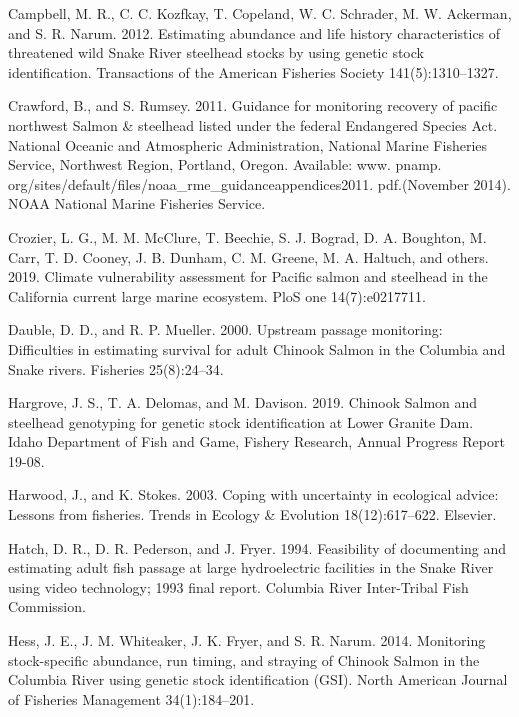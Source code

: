 \documentclass[
  12pt,
]{article}
\begin{document}
\leavevmode\hypertarget{ref-Campbell2012}{}%
Campbell, M. R., C. C. Kozfkay, T. Copeland, W. C. Schrader, M. W. Ackerman, and S. R. Narum. 2012. Estimating abundance and life history characteristics of threatened wild Snake River steelhead stocks by using genetic stock identification. Transactions of the American Fisheries Society 141(5):1310--1327.

\leavevmode\hypertarget{ref-Crawford2011}{}%
Crawford, B., and S. Rumsey. 2011. Guidance for monitoring recovery of pacific northwest Salmon \& steelhead listed under the federal Endangered Species Act. National Oceanic and Atmospheric Administration, National Marine Fisheries Service, Northwest Region, Portland, Oregon. Available: www. pnamp. org/sites/default/files/noaa\_rme\_guidanceappendices2011. pdf.(November 2014). NOAA National Marine Fisheries Service.

\leavevmode\hypertarget{ref-Crozier2019}{}%
Crozier, L. G., M. M. McClure, T. Beechie, S. J. Bograd, D. A. Boughton, M. Carr, T. D. Cooney, J. B. Dunham, C. M. Greene, M. A. Haltuch, and others. 2019. Climate vulnerability assessment for Pacific salmon and steelhead in the California current large marine ecosystem. PloS one 14(7):e0217711.

\leavevmode\hypertarget{ref-Dauble2000}{}%
Dauble, D. D., and R. P. Mueller. 2000. Upstream passage monitoring: Difficulties in estimating survival for adult Chinook Salmon in the Columbia and Snake rivers. Fisheries 25(8):24--34.

\leavevmode\hypertarget{ref-Hargrove2019}{}%
Hargrove, J. S., T. A. Delomas, and M. Davison. 2019. Chinook Salmon and steelhead genotyping for genetic stock identification at Lower Granite Dam. Idaho Department of Fish and Game, Fishery Research, Annual Progress Report 19-08.

\leavevmode\hypertarget{ref-Harwood2003}{}%
Harwood, J., and K. Stokes. 2003. Coping with uncertainty in ecological advice: Lessons from fisheries. Trends in Ecology \& Evolution 18(12):617--622. Elsevier.

\leavevmode\hypertarget{ref-Hatch1994}{}%
Hatch, D. R., D. R. Pederson, and J. Fryer. 1994. Feasibility of documenting and estimating adult fish passage at large hydroelectric facilities in the Snake River using video technology; 1993 final report. Columbia River Inter-Tribal Fish Commission.

\leavevmode\hypertarget{ref-Hess2014}{}%
Hess, J. E., J. M. Whiteaker, J. K. Fryer, and S. R. Narum. 2014. Monitoring stock-specific abundance, run timing, and straying of Chinook Salmon in the Columbia River using genetic stock identification (GSI). North American Journal of Fisheries Management 34(1):184--201.
\end{document}
